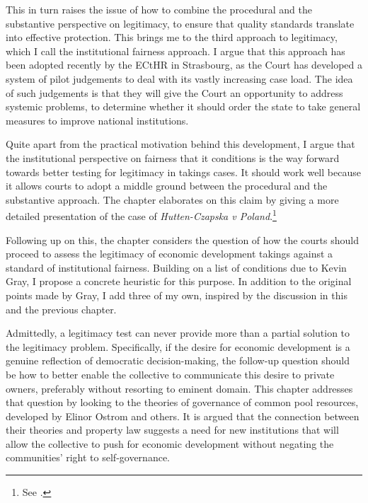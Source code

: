 This in turn raises the issue of how to combine the procedural and the substantive perspective on legitimacy, to ensure that quality standards translate into effective protection. This brings me to the third approach to legitimacy, which I call the institutional fairness approach. I argue that this approach has been adopted recently by the ECtHR in Strasbourg, as the Court has developed a system of pilot judgements to deal with its vastly increasing case load. The idea of such judgements is that they will give the Court an opportunity to address systemic problems, to determine whether it should order the state to take general measures to improve national institutions.

Quite apart from the practical motivation behind this development, I argue that the institutional perspective on fairness that it conditions is the way forward towards better testing for legitimacy in takings cases. It should work well because it allows courts to adopt a middle ground between the procedural and the substantive approach. The chapter elaborates on this claim by giving a more detailed presentation of the case of {\it Hutten-Czapska v Poland}.\footnote{See \cite{hutten06}.}

Following up on this, the chapter considers the question of how the courts should proceed to assess the legitimacy of economic development takings against a standard of institutional fairness. Building on a list of conditions due to Kevin Gray, I propose a concrete heuristic for this purpose. In addition to the original points made by Gray, I add three of my own, inspired by the discussion in this and the previous chapter. 

Admittedly, a legitimacy test can never provide more than a partial solution to the legitimacy problem. Specifically, if the desire for economic development is a genuine reflection of democratic decision-making, the follow-up question should be how to better enable the collective to communicate this desire to private owners, preferably without resorting to eminent domain. This chapter addresses that question by looking to the theories of governance of common pool resources, developed by Elinor Ostrom and others. It is argued that the connection between their theories and property law suggests a need for new institutions that will allow the collective to push for economic development without negating the communities' right to self-governance. 

